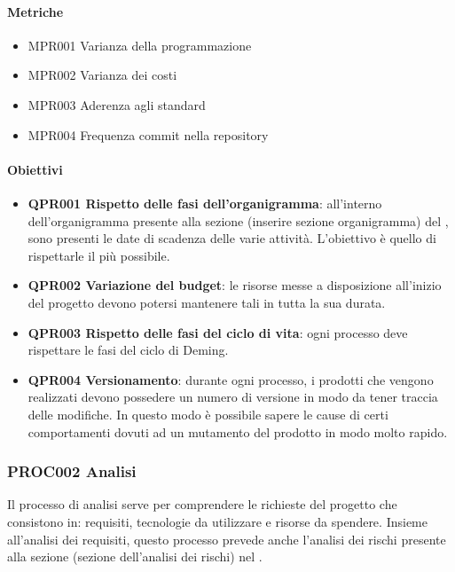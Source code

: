 		\paragraph*{Metriche}
		
		\begin{itemize}
			\item MPR001 Varianza della programmazione
			\item MPR002 Varianza dei costi
			\item MPR003 Aderenza agli standard
			\item MPR004 Frequenza commit nella repository
		\end{itemize}
	
		\paragraph*{Obiettivi}
		
		\begin{itemize} 
			\item \textbf{QPR001 Rispetto delle fasi dell'organigramma}: all'interno dell'organigramma presente alla sezione (inserire sezione organigramma) del \Doc{\PdPv}, sono presenti le date di scadenza delle varie attività. L'obiettivo è quello di rispettarle il più possibile.
			\item \textbf{QPR002 Variazione del budget}: le risorse messe a disposizione all'inizio del progetto devono potersi mantenere tali in tutta la sua durata.
			\item \textbf{QPR003 Rispetto delle fasi del ciclo di vita}: ogni processo deve rispettare le fasi del ciclo di Deming.
			\item \textbf{QPR004 Versionamento}: durante ogni processo, i prodotti che vengono realizzati devono possedere un numero di versione in modo da tener traccia delle modifiche. In questo modo è possibile sapere le cause di certi comportamenti dovuti ad un mutamento del prodotto in modo molto rapido.  
		\end{itemize}
	
	\subsubsection{PROC002 Analisi}
	Il processo di analisi serve per comprendere le richieste del progetto che consistono in: requisiti, tecnologie da utilizzare e risorse da spendere. Insieme all'analisi dei requisiti, questo processo prevede anche l'analisi dei rischi presente alla sezione (sezione dell'analisi dei rischi) nel \PdPv.
	
